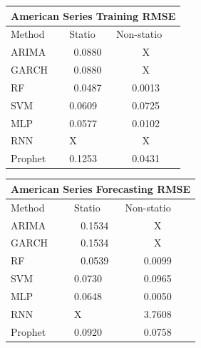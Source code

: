 \documentclass[10pt,twocolumn,letterpaper]{article}
\begin{document}
	\begin{table}[h]\label{table:trainingRMSE}
		\centering
		\begin{tabular}{|lll|}
			\hline
			\multicolumn{3}{|c|}{American Series Training RMSE}                                                  \\ \hline
			\multicolumn{1}{|l|}{Method}  & \multicolumn{1}{l|}{Statio} & Non-statio             \\ \hline
			\multicolumn{1}{|l|}{ARIMA}   & \multicolumn{1}{c|}{0.0880}       & \multicolumn{1}{c|}{X} \\ \hline
			\multicolumn{1}{|l|}{GARCH}   & \multicolumn{1}{c|}{0.0880}       & \multicolumn{1}{c|}{X} \\ \hline
			\multicolumn{1}{|l|}{RF}      & \multicolumn{1}{c|}{0.0487}       & \multicolumn{1}{c|}{0.0013}  \\ \hline
			\multicolumn{1}{|l|}{SVM}     & \multicolumn{1}{l|}{0.0609}       & \multicolumn{1}{c|}{0.0725}  \\ \hline
			\multicolumn{1}{|l|}{MLP}     & \multicolumn{1}{l|}{0.0577}       & \multicolumn{1}{c|}{0.0102}  \\ \hline
			\multicolumn{1}{|l|}{RNN}     & \multicolumn{1}{l|}{X}       & \multicolumn{1}{c|}{X}  \\ \hline
			\multicolumn{1}{|l|}{Prophet} & \multicolumn{1}{l|}{0.1253}       & \multicolumn{1}{c|}{0.0431}  \\ \hline
		\end{tabular}
	\end{table}
	
	\begin{table}[h]
		\label{table:forecastRMSE}
		\centering
		\begin{tabular}{|lll|}
			\hline
			\multicolumn{3}{|c|}{American Series Forecasting RMSE}                                                  \\ \hline
			\multicolumn{1}{|l|}{Method}  & \multicolumn{1}{l|}{Statio} & Non-statio             \\ \hline
			\multicolumn{1}{|l|}{ARIMA}   & \multicolumn{1}{c|}{0.1534}       & \multicolumn{1}{c|}{X} \\ \hline
			\multicolumn{1}{|l|}{GARCH}   & \multicolumn{1}{c|}{0.1534}       & \multicolumn{1}{c|}{X} \\ \hline
			\multicolumn{1}{|l|}{RF}      & \multicolumn{1}{c|}{0.0539}       & \multicolumn{1}{c|}{0.0099}  \\ \hline
			\multicolumn{1}{|l|}{SVM}     & \multicolumn{1}{l|}{0.0730}       & \multicolumn{1}{c|}{0.0965}  \\ \hline
			\multicolumn{1}{|l|}{MLP}     & \multicolumn{1}{l|}{0.0648}       & \multicolumn{1}{c|}{0.0050}  \\ \hline
			\multicolumn{1}{|l|}{RNN}     & \multicolumn{1}{l|}{X}       & \multicolumn{1}{c|}{3.7608}  \\ \hline
			\multicolumn{1}{|l|}{Prophet} & \multicolumn{1}{l|}{0.0920}       & \multicolumn{1}{c|}{0.0758}  \\ \hline
		\end{tabular}
	\end{table}
	
\end{document}

